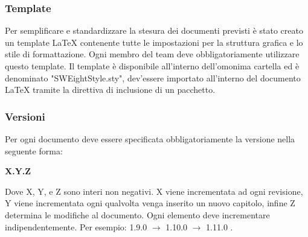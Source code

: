 \subsubsection{Template}
Per semplificare e standardizzare la stesura dei documenti previsti è stato creato un template \LaTeX{} contenente tutte le impostazioni per la struttura grafica e lo stile di formattazione. Ogni membro del team deve obbligatoriamente utilizzare questo {template}.
Il template è disponibile all'interno dell'omonima cartella ed è denominato "SWEightStyle.sty", dev'essere importato all'interno del documento \LaTeX{} tramite la direttiva di inclusione di un pacchetto.
\subsubsection{Versioni}
Per ogni documento deve essere specificata obbligatoriamente la versione nella seguente forma: 
\begin{center}
\textbf{X.Y.Z}
\end{center}
Dove X, Y, e Z sono interi non negativi. X viene incrementata ad ogni revisione, Y viene incrementata ogni qualvolta venga inserito un nuovo capitolo, infine Z determina le modifiche al documento. Ogni elemento deve incrementare indipendentemente. Per esempio: 1.9.0 $\rightarrow$ 1.10.0 $\rightarrow$ 1.11.0 .


